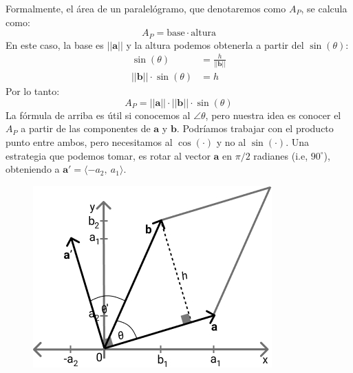 \documentclass[12pt]{article}
\begin{document}
Formalmente, el área de un paralelógramo, que denotaremos como $A_{P}$, se calcula como:
\[
  A_{P} = \text{base} \cdot \text{altura}
\]
En este caso, la base es $||\mathbf{a}||$ y la altura podemos obtenerla a partir del $\sin(\theta)$:
\begin{align*}
  \sin(\theta) &= \frac{h}{||\mathbf{b}||} \\
  ||\mathbf{b}|| \cdot \sin(\theta) &= h
\end{align*}
Por lo tanto:
\[
  A_{P} = ||\mathbf{a}|| \cdot ||\mathbf{b}|| \cdot \sin(\theta)
\]
La fórmula de arriba es útil si conocemos al $\angle \theta$, pero nuestra idea es conocer el $A_{P}$ a partir de las componentes de $\mathbf{a}$ y $\mathbf{b}$. Podríamos trabajar con el producto punto entre ambos, pero necesitamos al $\cos(\cdot)$ y no al $\sin(\cdot)$. Una estrategia que podemos tomar, es rotar al vector $\mathbf{a}$ en $\pi/2$ radianes (i.e, $90^{\circ}$), obteniendo a $\mathbf{a}' = \langle -a_{2}, \ a_{1} \rangle$.

\newpage

\begin{figure}[hbt!]
\centering
\includegraphics[scale=0.6]{img/det-area-parallelog-2.jpg}
\end{figure}
\end{document}
